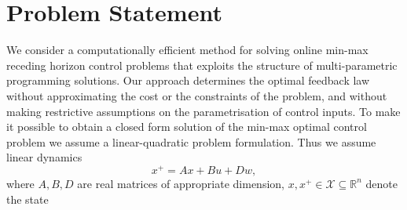 \documentclass{ifacconf}
\begin{document}
\section{Problem Statement}\label{sec:problem:statement}
We consider a computationally efficient method for solving online min-max receding horizon control problems
that exploits the structure of multi-parametric programming solutions. Our approach determines the optimal
feedback law without approximating the cost or the constraints of the problem, and without making restrictive
assumptions on the parametrisation of control inputs.
%
%
To make it possible to obtain a closed form solution of the min-max optimal control problem we assume a
linear-quadratic problem formulation. Thus we assume linear dynamics 
\begin{equation}\label{eq:system:equation}
	x^+ = A x + B u + D w,
\end{equation}
%
where $A,B,D$ are real matrices of appropriate dimension, $x,  x^+\in\mathcal X\subseteq\mathbb R^n$ denote the state 
\end{document}
